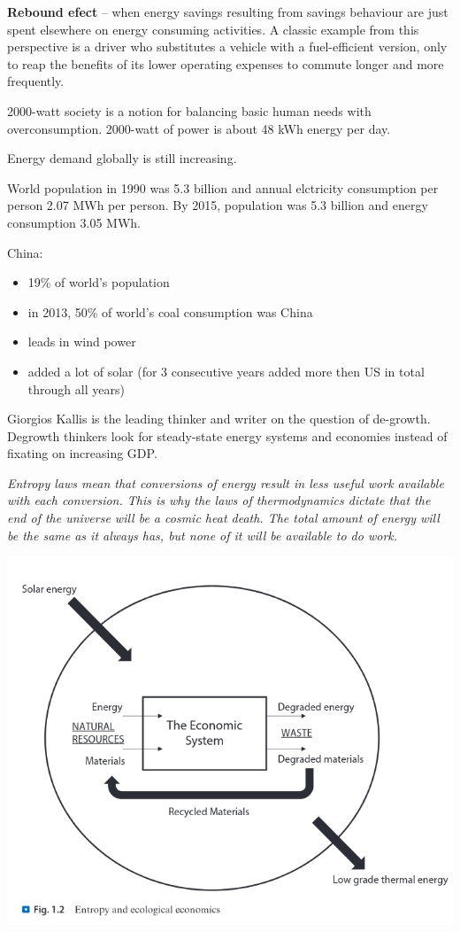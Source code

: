 \textbf{Rebound efect} -- when energy savings resulting from savings behaviour
are just spent elsewhere on energy consuming activities. A classic example
from this perspective is a driver who substitutes a vehicle with a
fuel-efficient version, only to reap the benefits of its lower operating
expenses to commute longer and more frequently.

2000-watt society is a notion for balancing basic human needs with
overconsumption. 2000-watt of power is about 48 kWh energy per day.

Energy demand globally is still increasing.

World population in 1990 was 5.3 billion and annual elctricity consumption
per person 2.07 MWh per person. By 2015, population was 5.3 billion and energy
consumption 3.05 MWh.

China:
\begin{itemize}
	\item 19\% of world's population
	\item in 2013, 50\% of world's coal consumption was China
	\item leads in wind power
	\item added a lot of solar (for 3 consecutive years added more then US
	in total through all years)
\end{itemize}

Giorgios Kallis is the leading thinker and writer on the question of de-growth.
Degrowth thinkers look for steady-state energy systems and economies instead
of fixating on increasing GDP.

\textit{
Entropy laws mean that conversions of energy result in less useful work
available with each conversion. This is why the laws of thermodynamics dictate
that the end of the universe will be a cosmic heat death. The total amount of
energy will be the same as it always has, but none of it will be available to
do work.
}

\includegraphics[scale=0.5]{content/img/entropy.png}

